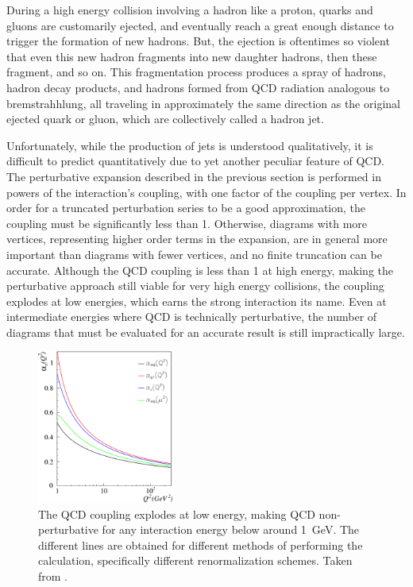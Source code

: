   During a high energy collision involving a hadron like a proton, quarks and gluons are customarily ejected, and eventually reach a great enough distance to trigger the formation of new hadrons.
  But, the ejection is oftentimes so violent that even this new hadron fragments into new daughter hadrons, then these fragment, and so on.
  This fragmentation process produces a spray of hadrons, hadron decay products, and hadrons formed from QCD radiation analogous to bremstrahhlung, all traveling in approximately the same direction as the original ejected quark or gluon, which are collectively called a hadron jet.

  Unfortunately, while the production of jets is understood qualitatively, it is difficult to predict quantitatively due to yet another peculiar feature of QCD.
  The perturbative expansion described in the previous section is performed in powers of the interaction's coupling, with one factor of the coupling per vertex.
  In order for a truncated perturbation series to be a good approximation, the coupling must be significantly less than 1.
  Otherwise, diagrams with more vertices, representing higher order terms in the expansion, are in general more important than diagrams with fewer vertices, and no finite truncation can be accurate.
  Although the QCD coupling is less than 1 at high energy, making the perturbative approach still viable for very high energy collisions, the coupling explodes at low energies, which earns the strong interaction its name.
  Even at intermediate energies where QCD is technically perturbative, the number of diagrams that must be evaluated for an accurate result is still impractically large.

  \begin{figure}[h!]
    \centering
    \includegraphics[width=0.4\textwidth]{figures/qcd_coupling.pdf}
    \caption[The QCD coupling as a function of the interaction energy.]{
      The QCD coupling explodes at low energy, making QCD non-perturbative for any interaction energy below around 1~GeV.
      The different lines are obtained for different methods of performing the calculation, specifically different renormalization schemes.
      Taken from \cite{qcd_coupling}.}
    \label{fig:QCDcoupling}
  \end{figure}  

